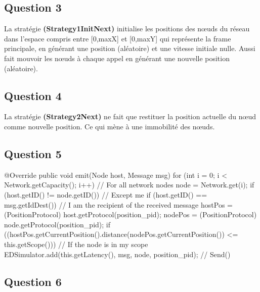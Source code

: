\documentclass[10pt]{report}
\begin{document}
\subsection{Question 3}
La stratégie \textbf{(Strategy1InitNext)} initialise les positions des nœuds du réseau dans l'espace compris entre [0,maxX] et [0,maxY] qui représente la frame principale, en générant une position (aléatoire) et une vitesse initiale nulle. Aussi fait mouvoir les nœuds à chaque appel en générant une nouvelle position (aléatoire).

\subsection{Question 4}
La stratégie \textbf{(Strategy2Next)} ne fait que restituer la position actuelle du nœud comme nouvelle position. Ce qui mène à une immobilité des nœuds.

\subsection{Question 5}

\begin{boxedlisting}
@Override
public void emit(Node host, Message msg) {
	for (int i = 0; i < Network.getCapacity(); i++) { // For all network nodes
		node = Network.get(i);
		if (host.getID() != node.getID()) { // Except me
			if (host.getID() == msg.getIdDest()) { // I am the recipient of the received message
				hostPos = (PositionProtocol) host.getProtocol(position_pid);
				nodePos = (PositionProtocol) node.getProtocol(position_pid);
				if ((hostPos.getCurrentPosition().distance(nodePos.getCurrentPosition()) <= this.getScope())) { // If the node is in my scope
					EDSimulator.add(this.getLatency(), msg, node, position_pid); // Send()
				}
			}
		}
	}
}
\end{boxedlisting}

\subsection{Question 6}
\end{document}
